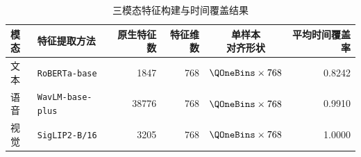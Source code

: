 \begin{table}[htbp]
\centering
\caption{三模态特征构建与时间覆盖结果}
\label{tab:q1_feature_scheme}
\begin{tabularx}{\textwidth}{@{}lXrrcr@{}}
\toprule
模态 & 特征提取方法 & 原生特征数 & 特征维数 & \shortstack{单样本\\对齐形状} & 平均时间覆盖率 \\
\midrule
文本 & \texttt{RoBERTa-base} & 1847 & 768 & $\QOneBins\times768$ & 0.8242 \\
语音 & \texttt{WavLM-base-plus} & 38776 & 768 & $\QOneBins\times768$ & 0.9910 \\
视觉 & \texttt{SigLIP2-B/16} & 3205 & 768 & $\QOneBins\times768$ & 1.0000 \\
\bottomrule
\end{tabularx}
\end{table}
